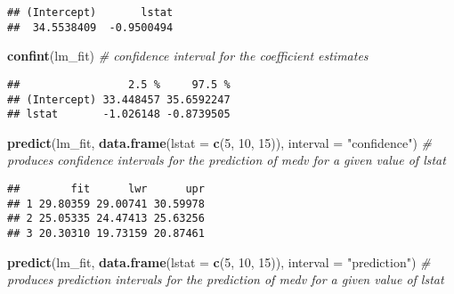\documentclass[]{article}
\newenvironment{Shaded}{\begin{snugshade}}{\end{snugshade}}
\newcommand{\CommentTok}[1]{\textcolor[rgb]{0.56,0.35,0.01}{\textit{#1}}}
\newcommand{\DataTypeTok}[1]{\textcolor[rgb]{0.13,0.29,0.53}{#1}}
\newcommand{\DecValTok}[1]{\textcolor[rgb]{0.00,0.00,0.81}{#1}}
\newcommand{\KeywordTok}[1]{\textcolor[rgb]{0.13,0.29,0.53}{\textbf{#1}}}
\newcommand{\NormalTok}[1]{#1}
\newcommand{\StringTok}[1]{\textcolor[rgb]{0.31,0.60,0.02}{#1}}
\begin{document}
\begin{Shaded}
\end{Shaded}

\begin{verbatim}
## (Intercept)       lstat 
##  34.5538409  -0.9500494
\end{verbatim}

\begin{Shaded}
\begin{Highlighting}[]
\KeywordTok{confint}\NormalTok{(lm_fit) }\CommentTok{# confidence interval for the coefficient estimates}
\end{Highlighting}
\end{Shaded}

\begin{verbatim}
##                 2.5 %     97.5 %
## (Intercept) 33.448457 35.6592247
## lstat       -1.026148 -0.8739505
\end{verbatim}

\begin{Shaded}
\begin{Highlighting}[]
\KeywordTok{predict}\NormalTok{(lm_fit, }\KeywordTok{data.frame}\NormalTok{(}\DataTypeTok{lstat =} \KeywordTok{c}\NormalTok{(}\DecValTok{5}\NormalTok{, }\DecValTok{10}\NormalTok{, }\DecValTok{15}\NormalTok{)), }\DataTypeTok{interval =} \StringTok{"confidence"}\NormalTok{) }\CommentTok{# produces confidence intervals for the prediction of medv for a given value of lstat}
\end{Highlighting}
\end{Shaded}

\begin{verbatim}
##        fit      lwr      upr
## 1 29.80359 29.00741 30.59978
## 2 25.05335 24.47413 25.63256
## 3 20.30310 19.73159 20.87461
\end{verbatim}

\begin{Shaded}
\begin{Highlighting}[]
\KeywordTok{predict}\NormalTok{(lm_fit, }\KeywordTok{data.frame}\NormalTok{(}\DataTypeTok{lstat =} \KeywordTok{c}\NormalTok{(}\DecValTok{5}\NormalTok{, }\DecValTok{10}\NormalTok{, }\DecValTok{15}\NormalTok{)), }\DataTypeTok{interval =} \StringTok{"prediction"}\NormalTok{) }\CommentTok{# produces prediction intervals for the prediction of medv for a given value of lstat}
\end{Highlighting}
\end{Shaded}
\end{document}
